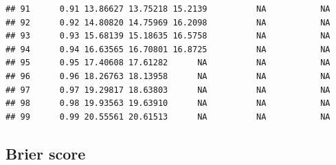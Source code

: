 \documentclass{article}\usepackage[]{graphicx}\usepackage[]{color}
\makeatletter
\newenvironment{kframe}{%
 \def\at@end@of@kframe{}%
 \ifinner\ifhmode%
  \def\at@end@of@kframe{\end{minipage}}%
  \begin{minipage}{\columnwidth}%
 \fi\fi%
 \def\FrameCommand##1{\hskip\@totalleftmargin \hskip-\fboxsep
 \colorbox{shadecolor}{##1}\hskip-\fboxsep
     \hskip-\linewidth \hskip-\@totalleftmargin \hskip\columnwidth}%
 \MakeFramed {\advance\hsize-\width
   \@totalleftmargin\z@ \linewidth\hsize
   \@setminipage}}%
 {\par\unskip\endMakeFramed%
 \at@end@of@kframe}
\newenvironment{knitrout}{}{} %
\makeatother
\begin{document}
\begin{knitrout}
\begin{kframe}
\begin{verbatim}
## 91      0.91 13.86627 13.75218 15.2139          NA           NA
## 92      0.92 14.80820 14.75969 16.2098          NA           NA
## 93      0.93 15.68139 15.18635 16.5758          NA           NA
## 94      0.94 16.63565 16.70801 16.8725          NA           NA
## 95      0.95 17.40608 17.61282      NA          NA           NA
## 96      0.96 18.26763 18.13958      NA          NA           NA
## 97      0.97 19.29817 18.63803      NA          NA           NA
## 98      0.98 19.93563 19.63910      NA          NA           NA
## 99      0.99 20.55561 20.61513      NA          NA           NA
\end{verbatim}
\end{kframe}
\end{knitrout}


\subsection{Brier score}
\end{document}
